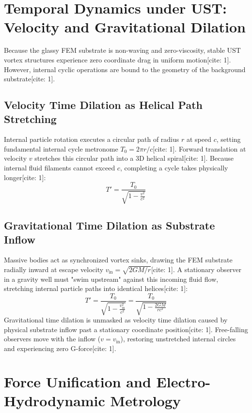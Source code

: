 \documentclass[11pt,a4paper]{article}
\begin{document}
	\section{Temporal Dynamics under UST: Velocity and Gravitational Dilation}
	
	Because the glassy FEM substrate is non-waving and zero-viscosity, stable UST vortex structures experience zero coordinate drag in uniform motion[cite: 1]. However, internal cyclic operations are bound to the geometry of the background substrate[cite: 1].
	
	\subsection{Velocity Time Dilation as Helical Path Stretching}
	Internal particle rotation executes a circular path of radius $r$ at speed $c$, setting fundamental internal cycle metronome $T_0 = 2\pi r / c$[cite: 1]. Forward translation at velocity $v$ stretches this circular path into a 3D helical spiral[cite: 1]. Because internal fluid filaments cannot exceed $c$, completing a cycle takes physically longer[cite: 1]:
	\begin{equation}
		T' = \frac{T_0}{\sqrt{1 - \frac{v^2}{c^2}}}
	\end{equation}
	
	\subsection{Gravitational Time Dilation as Substrate Inflow}
	Massive bodies act as synchronized vortex sinks, drawing the FEM substrate radially inward at escape velocity $v_{\text{in}} = \sqrt{2GM/r}$[cite: 1]. A stationary observer in a gravity well must "swim upstream" against this incoming fluid flow, stretching internal particle paths into identical helices[cite: 1]:
	\begin{equation}
		T' = \frac{T_0}{\sqrt{1 - \frac{v_{\text{in}}^2}{c^2}}} = \frac{T_0}{\sqrt{1 - \frac{2GM}{rc^2}}}
	\end{equation}
	Gravitational time dilation is unmasked as velocity time dilation caused by physical substrate inflow past a stationary coordinate position[cite: 1]. Free-falling observers move with the inflow ($v = v_{\text{in}}$), restoring unstretched internal circles and experiencing zero G-force[cite: 1].
	
	\section{Force Unification and Electro-Hydrodynamic Metrology}
	
\end{document}

